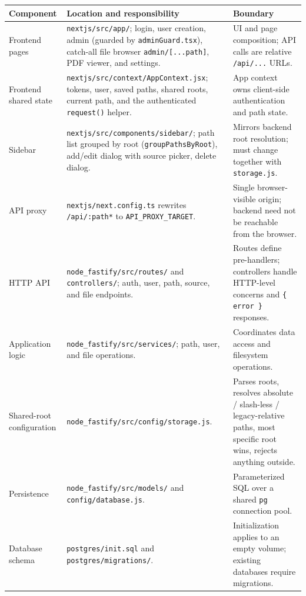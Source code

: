 \documentclass[10pt]{article}
\begin{document}
\small
\begin{tabularx}{\linewidth}{>{\raggedright\arraybackslash}p{4.3cm}
                              >{\raggedright\arraybackslash}X
                              >{\raggedright\arraybackslash}X}
\textbf{Component} & \textbf{Location and responsibility} & \textbf{Boundary} \\
\hline
Frontend pages & \texttt{nextjs/src/app/}; login, user creation, admin (guarded by \texttt{adminGuard.tsx}), catch-all file browser \texttt{admin/[...path]}, PDF viewer, and settings. &
UI and page composition; API calls are relative \texttt{/api/...} URLs. \\
Frontend shared state & \texttt{nextjs/src/context/AppContext.jsx}; tokens, user, saved paths, shared roots, current path, and the authenticated \texttt{request()} helper. &
App context owns client-side authentication and path state. \\
Sidebar & \texttt{nextjs/src/components/sidebar/}; path list grouped by root (\texttt{groupPathsByRoot}), add/edit dialog with source picker, delete dialog. &
Mirrors backend root resolution; must change together with \texttt{storage.js}. \\
API proxy & \texttt{nextjs/next.config.ts} rewrites \texttt{/api/:path*} to \texttt{API\_PROXY\_TARGET}. &
Single browser-visible origin; backend need not be reachable from the browser. \\
HTTP API & \texttt{node\_fastify/src/routes/} and \texttt{controllers/}; auth, user, path, source, and file endpoints. &
Routes define pre-handlers; controllers handle HTTP-level concerns and \texttt{\{ error \}} responses. \\
Application logic & \texttt{node\_fastify/src/services/}; path, user, and file operations. &
Coordinates data access and filesystem operations. \\
Shared-root configuration & \texttt{node\_fastify/src/config/storage.js}. &
Parses roots, resolves absolute / slash-less / legacy-relative paths, most specific root wins, rejects anything outside. \\
Persistence & \texttt{node\_fastify/src/models/} and \texttt{config/database.js}. &
Parameterized SQL over a shared \texttt{pg} connection pool. \\
Database schema & \texttt{postgres/init.sql} and \texttt{postgres/migrations/}. &
Initialization applies to an empty volume; existing databases require migrations. \\
\end{tabularx}
\normalsize
\end{document}
